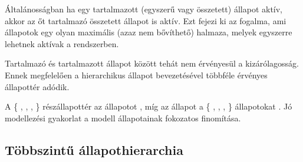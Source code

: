 Általánosságban ha egy tartalmazott (egyszerű vagy összetett) állapot aktív, akkor az őt tartalmazó összetett állapot is aktív. Ezt fejezi ki az  fogalma, ami állapotok egy olyan maximális (azaz nem bővíthető) halmaza, melyek egyszerre lehetnek aktívak a rendszerben.

\begin{megjegyzes}
%
\end{megjegyzes}

Tartalmazó és tartalmazott állapot között tehát nem érvényesül a kizárólagosság. Ennek megfelelően a hierarchikus állapot bevezetésével többféle érvényes állapottér adódik.

\begin{megjegyzes}
\end{megjegyzes}

A \{ , , ,  \} részállapottér az  állapotot , míg az  állapot a \{ , , ,  \} állapotokat . Jó modellezési gyakorlat a modell állapotainak fokozatos finomítása.

\subsection{Többszintű állapothierarchia}

